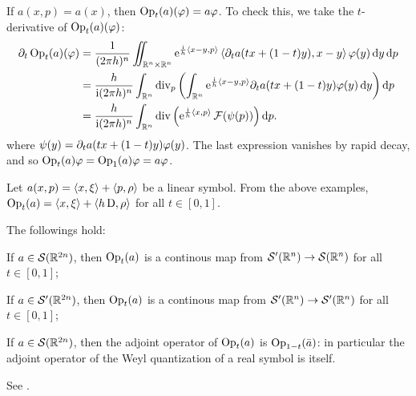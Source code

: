 \begin{nese}
If $a(x,p)=a(x)$, then $\operatorname{Op}_{t}(a)(\varphi)=a\varphi$. To check this, we take the $t$-derivative of $\operatorname{Op}_{t}(a)(\varphi)$:
\begin{align*}
\partial_{t}\operatorname{Op}_{t}(a)(\varphi)&=
\frac{1}{(2\pi h)^{n}}\iint_{\mathbb{R}^{n}\times\mathbb{R}^{n}}\mathrm{e}^{\frac{\mathrm{i}}{h}\left< x-y,p\right>}\left< \partial_{t}a(tx+(1-t)y),x-y\right>\varphi(y)\mathop{}\!\mathrm{d} y\mathop{}\!\mathrm{d} p\\
&=\frac{h}{\mathrm{i}(2\pi h)^{n}}\int_{\mathbb{R}^{n}}\operatorname{div}_{p}\left(
\int_{\mathbb{R}^{n}}\mathrm{e}^{\frac{\mathrm{i}}{h}\left< x-y,p\right>}\partial_{t}a(tx+(1-t)y)\varphi(y)\mathop{}\!\mathrm{d} y\right)\mathop{}\!\mathrm{d} p\\
&=\frac{h}{\mathrm{i}(2\pi h)^{n}}\int_{\mathbb{R}^{n}}\operatorname{div}\left(\mathrm{e}^{\frac{\mathrm{i}}{h}\left< x,p\right>}\operatorname{\mathcal{F}}(\psi(p))\right)\mathop{}\!\mathrm{d} p.
\end{align*}
where $\psi(y)=\partial_{t}a(tx+(1-t)y)\varphi(y)$. The last expression vanishes by rapid decay, and so $\operatorname{Op}_{t}(a)\varphi=\operatorname{Op}_{1}(a)\varphi=a\varphi$.
\end{nese}


\begin{nese}
\label{ese:quant_linear_symb}
Let $a(x,p)=\left< x,\xi\right>+\left< p,\rho\right>$ be a linear symbol. From the above examples, $\operatorname{Op}_{t}(a)=\left< x,\xi\right>+\left< h\operatorname{D},\rho\right>$ for all $t\in[0,1]$.
\end{nese}


\begin{nprop}
The followings hold:
\label{prop:quant_properties}
\begin{compactitem}
\item If $a\in\mathcal{S}(\mathbb{R}^{2n})$, then $\operatorname{Op}_{t}(a)$ is a continous map from $\mathcal{S}'(\mathbb{R}^{n})\to\mathcal{S}(\mathbb{R}^{n})$ for all $t\in[0,1]$;
\item If $a\in\mathcal{S}'(\mathbb{R}^{2n})$, then $\operatorname{Op}_{t}(a)$ is a continous map from $\mathcal{S}'(\mathbb{R}^{n})\to\mathcal{S}'(\mathbb{R}^{n})$ for all $t\in[0,1]$;
\item If $a\in\mathcal{S}(\mathbb{R}^{2n})$, then the adjoint operator of $\operatorname{Op}_{t}(a)$ is $\operatorname{Op}_{1-t}(\bar{a})$: in particular the adjoint operator of the Weyl quantization of a real symbol is itself.
\end{compactitem}
\end{nprop}
\begin{prf}
See \cite{Martinez:semi}.
\end{prf}

